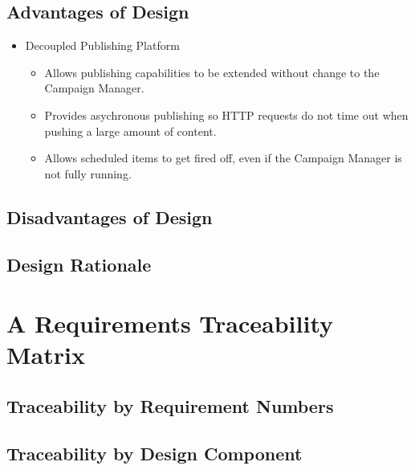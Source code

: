 \documentclass{report}
\begin{document}
\subsection{Advantages of Design}
\begin{itemize}
\item Decoupled Publishing Platform
  \begin{itemize}
  \item Allows publishing capabilities to be extended without change to the Campaign Manager.
  \item Provides asychronous publishing so HTTP requests do not time out when pushing a large amount of content.
  \item Allows scheduled items to get fired off, even if the Campaign Manager is not fully running.
  \end{itemize}
\end{itemize}
\subsection{Disadvantages of Design}
\subsection{Design Rationale}
\section{A Requirements Traceability Matrix}
\subsection{Traceability by Requirement Numbers}
\subsection{Traceability by Design Component}
\end{document}
